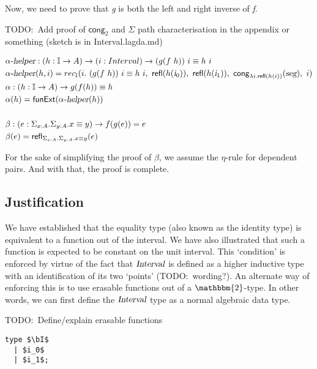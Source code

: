 \documentclass[11pt]{article}
\newcommand\kw[1] {\textsf{#1}}
\newcommand\id[1] {\textsl{#1}}
\begin{document}
Now, we need to prove that \id{g} is both the left and right inverse of \id{f}.

TODO:\ Add proof of $\kw{cong}_2$ and $\Sigma$ path characterisation in the appendix or something (sketch is in Interval.lagda.md)

\begin{align*}
  & \id{$\alpha$-helper} : (\oftype{h}{\bI \rightarrow A}) \rightarrow (\oftype{i}{Interval}) \rightarrow \eqtype{(g (f \ h)) \ i}{h \ i} \\
  & \id{$\alpha$-helper} (h , i) = rec_{\bI}(i . \ \eqtype{(g (f \ h)) \ i}{h \ i}, \ \refl{h(\ileft)}, \ \refl{h(\iright)}, \ \kw{cong}_{\lambda i . \refl{h(i)}}(\id{seg}), \ i) \\
  & \alpha : (\oftype{h}{\bI \rightarrow A}) \rightarrow \eqtype{g(f(h))}{h} \\
  & \alpha(h) =  \kw{funExt} (\id{$\alpha$-helper} (h)) \\ \\
  & \beta :  (\oftype{e}{\Sigma_{\oftype{x}{A}} . \Sigma_{\oftype{y}{A}} . \eqtype{x}{y}}) \rightarrow f(g(e)) = e \\
  & \beta(e) =  \refl{\Sigma_{\oftype{x}{A}} . \Sigma_{\oftype{y}{A}} . \eqtype{x}{y}}{e}
\end{align*}

For the sake of simplifying the proof of $\beta$, we assume the $\eta$-rule for dependent pairs. And with that, the proof is complete.

\subsection{Justification}
We have established that the equality type (also known as the identity type) is equivalent to a function out of the interval. We have also illustrated that such a function is expected to be constant on the unit interval. This `condition' is enforced by virtue of the fact that $\id{Interval}$ is defined as a higher inductive type with an identification of its two `points' (TODO:\ wording?). An alternate way of enforcing this is to use erasable functions out of a $\mathbbm{2}$-type. In other words, we can first define the $\id{Interval}$ type as a normal algebraic data type.

TODO:\ Define/explain erasable functions

\begin{lstlisting}
type $\bI$
  | $i_0$
  | $i_1$;
\end{lstlisting}
\end{document}
